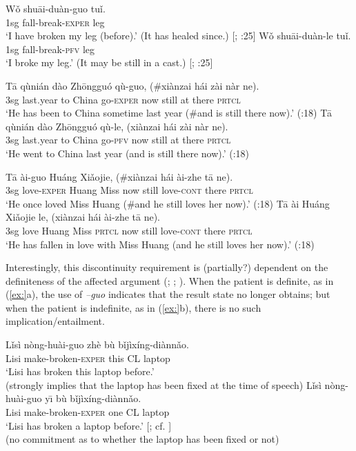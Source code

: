 \ea
\ea  \gll Wǒ  shu\=ai-duàn-guo  tuǐ.\\
1sg  fall-break-\textsc{exper}  leg\\
\glt ‘I have broken my leg (before).’ (It has healed since.) [\citealt{Chao1968}; \citealt{Ma1977}:25]
\ex \gll Wǒ  shu\=ai-duàn-le  tuǐ.\\
1sg  fall-break-\textsc{pfv}  leg\\
\glt ‘I broke my leg.’  (It may be still in a cast.)  [\citealt{Chao1968}; \citealt{Ma1977}:25]
\z \z

\ea
\ea \gll T\=a  qùnián  dào  Zh\=ongguó  qù-guo,  (\#xiànzai  hái  zài  nàr  ne).\\
3sg  last.year  to  China  go-\textsc{exper}    now  still  at  there  \textsc{prtcl}\\
\glt ‘He has been to China sometime last year (\#and is still there now).’  (\citealt{Ma1977}:18)
\ex \gll  T\=a  qùnián  dào  Zh\=ongguó  qù-le,  (xiànzai  hái  zài  nàr  ne).\\
3sg  last.year  to  China  go-\textsc{pfv} now  still  at  there  \textsc{prtcl}\\
\glt ‘He went to China last year (and is still there now).’  (\citealt{Ma1977}:18)
\z \z

\ea
\ea \gll  T\=a  ài-guo  Huáng  Xiǎojie,  (\#xiànzai  hái  ài-zhe  t\=a  ne).\\
3sg  love-\textsc{exper}  Huang  Miss now  still  love-\textsc{cont}  there  \textsc{prtcl}\\
\glt ‘He once loved Miss Huang (\#and he still loves her now).’  (\citealt{Ma1977}:18)
\ex \gll  T\=a  ài  Huáng  Xiǎojie  le,  (xiànzai  hái  ài-zhe  t\=a  ne).\\
3sg  love  Huang  Miss \textsc{prtcl} now  still  love-\textsc{cont}  there  \textsc{prtcl}\\
\glt ‘He has fallen in love with Miss Huang (and he still loves her now).’  (\citealt{Ma1977}:18)
\z \z


Interestingly, this discontinuity requirement is (partially?) dependent on the definiteness of the affected argument (\citealt{Lin2007}; \citealt{Wu2008}; \citealt{Chen2009}). When the patient is definite, as in (\ref{ex:}a), the use of \textit{–guo} indicates that the result state no longer obtains; but when the patient is indefinite, as in (\ref{ex:}b), there is no such implication/entailment.


\ea
\ea  \gll Lǐsì  nòng-huài-guo  zhè  bù  bǐjìxíng-diànnǎo.\\
Lisi  make-broken-\textsc{exper}  this  CL  laptop\\
\glt ‘Lisi has broken this laptop before.’\\
(strongly implies that the laptop has been fixed at the time of speech)
\ex \gll  Lǐsì  nòng-huài-guo  y\={\i}  bù  bǐjìxíng-diànnǎo.\\
Lisi  make-broken-\textsc{exper}  one  CL  laptop\\
\glt ‘Lisi has broken a laptop before.’  [\citealt{Chen2009}; cf. \citealt{Lin2007}]\\
(no commitment as to whether the laptop has been fixed or not)
\z \z


